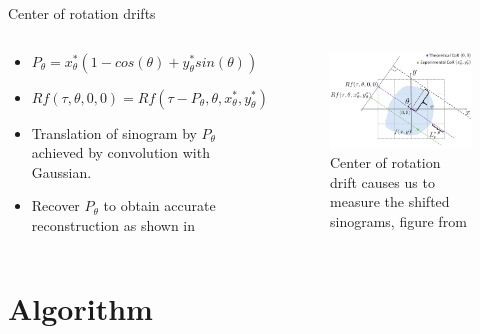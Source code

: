 \documentclass[aspectratio=43]{beamer}
\begin{document}
\begin{frame}{Center of rotation drifts}
\begin{columns}[onlytextwidth,T]
	\column{\dimexpr\linewidth-45mm}
	\begin{block}{}
	\begin{itemize}
		\item $P_{\theta} = x_{\theta}^{*}(1-cos(\theta) + y_{\theta}^{*}sin(\theta))$ 
		\item $Rf(\tau,\theta,0,0) = Rf(\tau - P_{\theta},\theta,x_{\theta}^{*},y_{\theta}^{*})$
		\item Translation of sinogram by $P_{\theta}$ achieved by convolution with Gaussian.
		\item Recover $P_{\theta}$ to obtain accurate reconstruction as shown in \cite{wendy_2019}
	\end{itemize}					
	\end{block}
	\column{40mm}
	\begin{figure}
		\includegraphics[width=45mm]{figures/drifts.png}
		\caption{Center of rotation drift causes us to measure the shifted sinograms, figure from \cite{wendy_2019}}
	\end{figure}
	\end{columns}
\end{frame}

\section{Algorithm}
\end{document}
